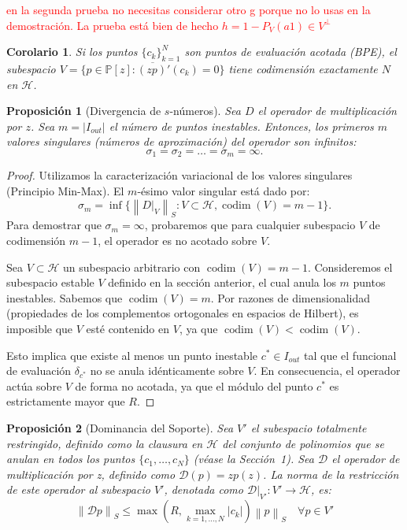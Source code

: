 \documentclass[12pt,a4paper]{article}
\newtheorem{corolario}{Corolario}
\newtheorem{proposicion}{Proposición}
\theoremstyle{definition}
\theoremstyle{remark}
\newcommand{\Poly}{\mathbb{P}[z]}
\newcommand{\norm}[1]{\left\| #1 \right\|_S}
\newcommand{\D}{\mathcal{D}}
\begin{document}
\textcolor{red}{en la segunda prueba no necesitas considerar otro g porque no lo usas en la demostración. La prueba está bien de hecho $h=1-P_V(a1)\in V^{\perp}$}
\begin{corolario}
    Si los puntos $\{c_k\}_{k=1}^N$ son puntos de evaluación acotada (BPE), el subespacio $V = \overline{\{p \in \Poly : (zp)'(c_k)=0\}}$ tiene codimensión exactamente $N$ en $\mathcal{H}$.
\end{corolario}

\begin{proposicion}[Divergencia de $s$-números]
    \cite{gohberg1969introduction} Sea $D$ el operador de multiplicación por $z$. Sea $m = |I_{out}|$ el número de puntos inestables. Entonces, los primeros $m$ valores singulares (números de aproximación) del operador son infinitos:
    \begin{equation}
        \sigma_1 = \sigma_2 = \dots = \sigma_m = \infty.
    \end{equation}
\end{proposicion}

\begin{proof}
    Utilizamos la caracterización variacional de los valores singulares (Principio Min-Max). El $m$-ésimo valor singular está dado por:
    $$ \sigma_m = \inf \{ \norm{D|_V} : V \subset \mathcal{H}, \operatorname{codim}(V) = m-1 \}. $$
    Para demostrar que $\sigma_m = \infty$, probaremos que para cualquier subespacio $V$ de codimensión $m-1$, el operador es no acotado sobre $V$.

    Sea $V \subset \mathcal{H}$ un subespacio arbitrario con $\operatorname{codim}(V) = m-1$.
    Consideremos el subespacio estable $V$ definido en la sección anterior, el cual anula los $m$ puntos inestables. Sabemos que $\operatorname{codim}(V) = m$. Por razones de dimensionalidad (propiedades de los complementos ortogonales en espacios de Hilbert), es imposible que $V$ esté contenido en $V$, ya que $\operatorname{codim}(V) < \operatorname{codim}(V)$.

    Esto implica que existe al menos un punto inestable $c^* \in I_{out}$ tal que el funcional de evaluación $\delta_{c^*}$ no se anula idénticamente sobre $V$. En consecuencia, el operador actúa sobre $V$ de forma no acotada, ya que el módulo del punto $c^*$ es estrictamente mayor que $R$.

    
\end{proof}

\begin{proposicion}[Dominancia del Soporte]
    Sea $V'$ el subespacio totalmente restringido, definido como la clausura en $\mathcal{H}$ del conjunto de polinomios que se anulan en todos los puntos $\{c_1, \dots, c_N\}$ (véase la Sección~1).
    Sea $\D$ el operador de multiplicación por z, definido como $\D(p) = z p(z)$. La norma de la restricción de este operador al subespacio $V'$, denotada como $\D|_{V'} : V' \to \mathcal{H}$, es:
    \begin{equation}
        \norm{\D p} \le \max \left( R, \max_{k=1,\dots,N} |c_k| \right) \norm{p} \quad \forall p \in V'
    \end{equation}
\end{proposicion}
\end{document}
